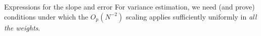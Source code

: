 \begin{frame}[t]{Expressions for the slope and error}
{    For variance estimation, we need (and prove) conditions under which the
    $O_p(N^{-2})$ scaling applies sufficiently uniformly in \emph{all the weights}.    
}

%



\end{frame}




